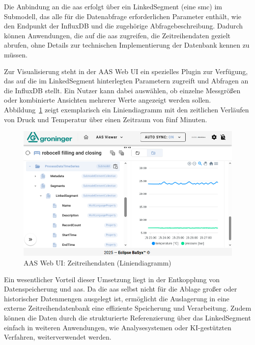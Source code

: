 Die Anbindung an die \acs{aas} erfolgt über ein LinkedSegment (eine \acs{smc}) im Submodell, das alle für die Datenabfrage erforderlichen Parameter enthält, wie den Endpunkt der InfluxDB und die zugehörige Abfragebeschreibung. 
Dadurch können Anwendungen, die auf die \acs{aas} zugreifen, die Zeitreihendaten gezielt abrufen, ohne Details zur technischen Implementierung der Datenbank kennen zu müssen.

Zur Visualisierung steht in der AAS Web UI ein spezielles Plugin zur Verfügung, das auf die im LinkedSegment hinterlegten Parametern zugreift und Abfragen an die InfluxDB stellt. 
Ein Nutzer kann dabei auswählen, ob einzelne Messgrößen oder kombinierte Ansichten mehrerer Werte angezeigt werden sollen. 
Abbildung~\ref{fig:LiniendiagrammBaSyx} zeigt exemplarisch ein Liniendiagramm mit den zeitlichen Verläufen von Druck und Temperatur über einen Zeitraum von fünf Minuten.

\begin{figure}[htbp]
    \centering
        \includegraphics[width=1\textwidth]{Bilder/Ergebnisse/DynamischeDaten/ZeitreihenDaten/Liniendiagramm.png}
    \caption{AAS Web UI: Zeitreihendaten (Liniendiagramm)}
    \label{fig:LiniendiagrammBaSyx}
\end{figure}

Ein wesentlicher Vorteil dieser Umsetzung liegt in der Entkopplung von Datenspeicherung und \acs{aas}. 
Da die \acs{aas} selbst nicht für die Ablage großer oder historischer Datenmengen ausgelegt ist, ermöglicht die Auslagerung in eine externe Zeitreihendatenbank eine effiziente Speicherung und Verarbeitung. 
Zudem können die Daten durch die strukturierte Referenzierung über das LinkedSegment einfach in weiteren Anwendungen, wie Analysesystemen oder KI-gestützten Verfahren, weiterverwendet werden.

